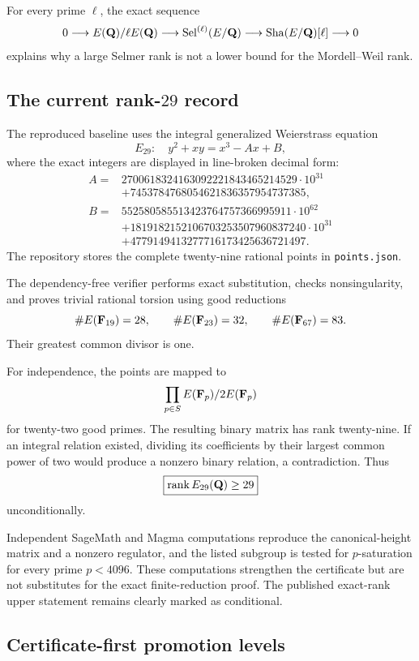For every prime $\ell$, the exact sequence
\[
0\longrightarrow E(\mathbf Q)/\ell E(\mathbf Q)
\longrightarrow \operatorname{Sel}^{(\ell)}(E/\mathbf Q)
\longrightarrow \operatorname{Sha}(E/\mathbf Q)[\ell]
\longrightarrow0
\]
explains why a large Selmer rank is not a lower bound for the Mordell--Weil
rank.

\subsection{The current rank-$29$ record}

The reproduced baseline uses the integral generalized Weierstrass equation
\[
E_{29}:\quad y^2+xy=x^3-Ax+B,
\]
where the exact integers are displayed in line-broken decimal form:
\[
\begin{aligned}
A={}&2700618324163092221843465214529\cdot10^{31}\\
   &+7453784768054621836357954737385,\\[2pt]
B={}&552580585513423764757366995911\cdot10^{62}\\
   &+1819182152106703253507960837240\cdot10^{31}\\
   &+4779149413277716173425636721497.
\end{aligned}
\]
The repository stores the complete twenty-nine rational points in
\texttt{points.json}.

The dependency-free verifier performs exact substitution, checks
nonsingularity, and proves trivial rational torsion using good reductions
\[
\#E(\mathbf F_{19})=28,\qquad
\#E(\mathbf F_{23})=32,\qquad
\#E(\mathbf F_{67})=83.
\]
Their greatest common divisor is one.

For independence, the points are mapped to
\[
\prod_{p\in S}E(\mathbf F_p)/2E(\mathbf F_p)
\]
for twenty-two good primes.  The resulting binary matrix has rank twenty-nine.
If an integral relation existed, dividing its coefficients by their largest
common power of two would produce a nonzero binary relation, a contradiction.
Thus
\[
\boxed{\operatorname{rank} E_{29}(\mathbf Q)\ge29}
\]
unconditionally.

Independent SageMath and Magma computations reproduce the canonical-height
matrix and a nonzero regulator, and the listed subgroup is tested for
$p$-saturation for every prime $p<4096$.  These computations strengthen the
certificate but are not substitutes for the exact finite-reduction proof.
The published exact-rank upper statement remains clearly marked as
conditional.

\subsection{Certificate-first promotion levels}

